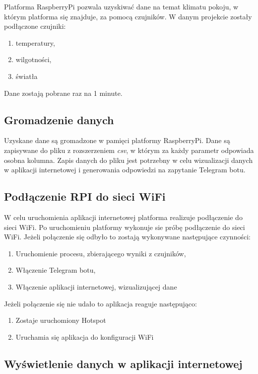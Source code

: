 \documentclass[a4paper]{article}
\begin{document}
Platforma RaspberryPi pozwala uzyskiwać dane na temat klimatu pokoju, w którym platforma się znajduje, za pomocą czujników. W danym projekcie zostały podłączone czujniki:
\begin{enumerate}
\item temperatury,
\item wilgotności,
\item światła
\end{enumerate}

Dane zostają pobrane raz na 1 minute.

\subsection{Gromadzenie danych}

Uzyskane dane są gromadzone w pamięci platformy RaspberryPi. Dane są zapisywane do pliku z rozszerzeniem \textit{csv}, w którym za każdy parametr odpowiada osobna kolumna.
\newline Zapis danych do pliku jest potrzebny w celu wizualizacji danych w aplikacji internetowej i generowania odpowiedzi na zapytanie Telegram botu.

\subsection{Podłączenie RPI do sieci WiFi}

W celu uruchomienia aplikacji internetowej platforma realizuje podłączenie do sieci WiFi. Po uruchomieniu platformy wykonuje sie próbę podłączenie do sieci WiFi. \newline
Jeżeli połączenie się odbyło to zostają wykonywane następujące czynności:
\begin{enumerate}
\item Uruchomienie procesu, zbierającego wyniki z czujników,
\item Włączenie Telegram botu,
\item Włączenie aplikacji internetowej, wizualizującej dane
\end{enumerate}
\newline
Jeżeli połączenie się nie udało to aplikacja reaguje następująco:
\begin{enumerate}
\item Zostaje uruchomiony Hotspot
\item Uruchamia się aplikacja do konfiguracji WiFi
\end{enumerate}

\subsection{Wyświetlenie danych w aplikacji internetowej}
\end{document}
